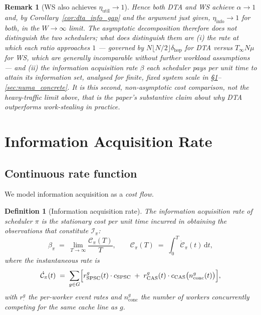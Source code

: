 \documentclass[11pt,a4paper]{report}
\newtheorem{definition}{Definition}[section]
\newtheorem{remark}{Remark}[section]
\begin{document}
\begin{remark}[WS also achieves $\eta_{\mathrm{util}}\to 1$]
Hence \emph{both} DTA and WS achieve $\alpha \to 1$ and, by
Corollary~\ref{cor:dta_info_gap} and the argument just given,
$\eta_{\mathrm{info}} \to 1$ for both, in the $W \to \infty$ limit. The
asymptotic decomposition therefore does \emph{not} distinguish the two
schedulers; what does distinguish them are (i) the \emph{rate} at which
each ratio approaches $1$ --- governed by $N\lfloor N/2\rfloor\delta_{\mathrm{hop}}$
for DTA versus $T_\infty N\mu$ for WS, which are generally incomparable
without further workload assumptions --- and (ii) the information
acquisition rate $\beta$ each scheduler pays \emph{per unit time} to
attain its information set, analysed for finite, fixed system scale in
\S\ref{sec:info_cost}--\ref{sec:numa_concrete}. It is this second,
non-asymptotic cost comparison, not the heavy-traffic limit above, that
is the paper's substantive claim about why DTA outperforms
work-stealing in practice.
\end{remark}

\section{Information Acquisition Rate}
\label{sec:info_cost}

\subsection{Continuous rate function}

We model information acquisition as a \emph{cost flow}.

\begin{definition}[Information acquisition rate]\label{def:beta}
The \emph{information acquisition rate} of scheduler $\pi$ is the
stationary cost per unit time incurred in obtaining the observations that
constitute $\mathcal{I}_\pi$:
\begin{equation}\label{eq:beta_def}
  \beta_\pi
  \;=\;
  \lim_{T\to\infty}
  \frac{\mathcal{C}_\pi(T)}{T},
  \qquad
  \mathcal{C}_\pi(T)
  \;=\;
  \int_0^T \dot{\mathcal{C}}_\pi(t)\,\mathrm{d}t,
\end{equation}
where the instantaneous rate is
\begin{equation}\label{eq:cdot}
  \dot{\mathcal{C}}_\pi(t)
  \;=\;
  \sum_{g \in G}
  \Bigl[
    r_{\mathrm{SPSC}}^g(t)\cdot c_{\mathrm{SPSC}}
    \;+\;
    r_{\mathrm{CAS}}^g(t)\cdot c_{\mathrm{CAS}}\bigl(n_{\mathrm{conc}}^g(t)\bigr)
  \Bigr],
\end{equation}
with $r^g_{\cdot}$ the per-worker event rates and $n_{\mathrm{conc}}^g$
the number of workers concurrently competing for the same cache line as $g$.
\end{definition}
\end{document}

